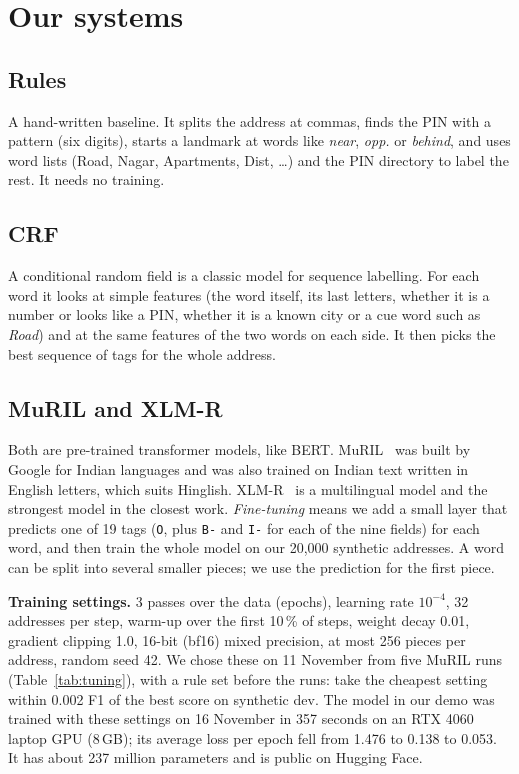 \documentclass[11pt,a4paper]{article}
\newcommand{\code}[1]{\texttt{#1}}
\begin{document}
\section{Our systems}

\subsection{Rules}
A hand-written baseline. It splits the address at commas, finds the PIN with a pattern (six digits), starts a
landmark at words like \emph{near}, \emph{opp.} or \emph{behind}, and uses word lists (Road, Nagar, Apartments,
Dist, \ldots) and the PIN directory to label the rest. It needs no training.

\subsection{CRF}
A conditional random field is a classic model for sequence labelling. For each word it looks at simple features (the
word itself, its last letters, whether it is a number or looks like a PIN, whether it is a known city or a cue word
such as \emph{Road}) and at the same features of the two words on each side. It then picks the best sequence of tags
for the whole address.

\subsection{MuRIL and XLM-R}
Both are pre-trained transformer models, like BERT. MuRIL~\cite{muril} was built by Google for Indian languages and
was also trained on Indian text written in English letters, which suits Hinglish. \mbox{XLM-R}~\cite{xlmr} is a multilingual
model and the strongest model in the closest work. \emph{Fine-tuning} means we add a small layer that predicts one of
19 tags (\code{O}, plus \code{B-} and \code{I-} for each of the nine fields) for each word, and then train the whole
model on our 20,000 synthetic addresses. A word can be split into several smaller pieces; we use the prediction for
the first piece.

\textbf{Training settings.} 3 passes over the data (epochs), learning rate $10^{-4}$, 32 addresses per step, warm-up
over the first 10\,\% of steps, weight decay 0.01, gradient clipping 1.0, 16-bit (bf16) mixed precision, at most 256
pieces per address, random seed 42. We chose these on 11 November from five MuRIL runs (Table~\ref{tab:tuning}), with
a rule set before the runs: take the cheapest setting within 0.002 F1 of the best score on synthetic dev. The model in
our demo was trained with these settings on 16 November in 357 seconds on an RTX 4060 laptop GPU (8\,GB); its average
loss per epoch fell from 1.476 to 0.138 to 0.053. It has about 237 million parameters and is public on Hugging Face.
\end{document}
